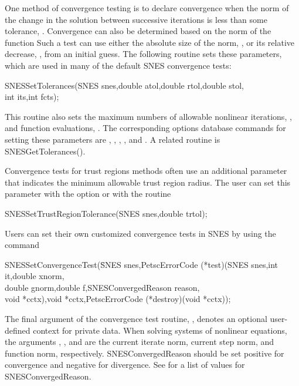 One method of convergence testing is
to declare convergence when the norm of the change in the solution
between successive iterations is less than some tolerance, .
Convergence can also be determined based on the norm of the function
Such a test can use either the absolute size of the
norm, , or its relative decrease, , from an initial
guess.  The following routine sets these parameters, which are used
in many of the default SNES convergence tests:
\begin{tabbing}
  SNESSetTolerances(SNES snes,double atol,double rtol,double stol,\\
          int its,int fcts);
\end{tabbing}
This routine also sets the maximum numbers of allowable
nonlinear iterations, , and function evaluations, .
The corresponding options database commands for setting these parameters
are , , ,
   
 
, and .
A related routine is SNESGetTolerances().

Convergence tests for trust regions methods often use an additional
parameter that indicates the minimum allowable trust region radius.
The user can set this parameter with the option 
 or with the routine
\begin{tabbing}
  SNESSetTrustRegionTolerance(SNES snes,double trtol);
\end{tabbing}

Users can set their own customized convergence tests in SNES by using
the command
\begin{tabbing}
  SNESSetConvergenceTest(\=SNES snes,PetscErrorCode (*test)(SNES snes,int it,double xnorm,\\
                         \>double gnorm,double f,SNESConvergedReason reason,\\
                         \>void *cctx),void *cctx,PetscErrorCode (*destroy)(void *cctx));
\end{tabbing}
The final argument of the convergence test routine, ,
denotes an optional user-defined context for private data.  When
solving systems of nonlinear equations, the arguments ,
, and  are the current iterate norm, current step
norm, and function norm, respectively.
SNESConvergedReason should be set positive
for convergence and negative for divergence. See 
for a list of values for SNESConvergedReason.

